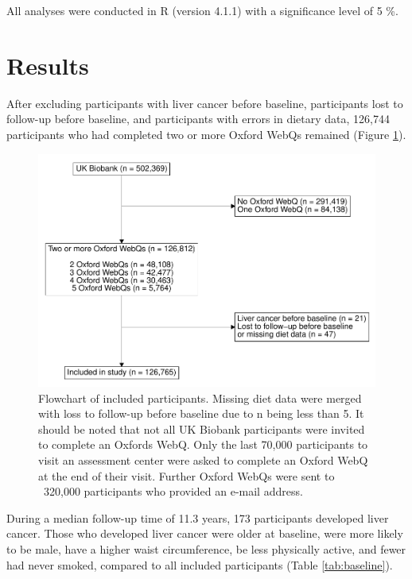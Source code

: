 \documentclass[nutrients,article,submit,moreauthors,pdftex]{Definitions/mdpi}
\begin{document}
All analyses were conducted in R (version 4.1.1) with a significance
level of 5 \%.

\hypertarget{sec3}{%
\section{Results}\label{sec3}}

After excluding participants with liver cancer before baseline,
participants lost to follow-up before baseline, and participants with
errors in dietary data, 126,744 participants who had completed two or
more Oxford WebQs remained (Figure \ref{fig:fig1}).

\begin{figure}

{\centering \includegraphics[width=1\linewidth,]{legliv-nutrients_files/figure-latex/fig1-1}

}

\caption{Flowchart of included participants. Missing diet data were merged with loss to follow-up before baseline due to n being less than 5. It should be noted that not all UK Biobank participants were invited to complete an Oxfords WebQ. Only the last 70,000 participants to visit an assessment center were asked to complete an Oxford WebQ at the end of their visit. Further Oxford WebQs were sent to ~320,000 participants who provided an e-mail address.}\label{fig:fig1}
\end{figure}

During a median follow-up time of 11.3 years, 173 participants developed
liver cancer. Those who developed liver cancer were older at baseline,
were more likely to be male, have a higher waist circumference, be less
physically active, and fewer had never smoked, compared to all included
participants (Table \ref{tab:baseline}).
\end{document}

